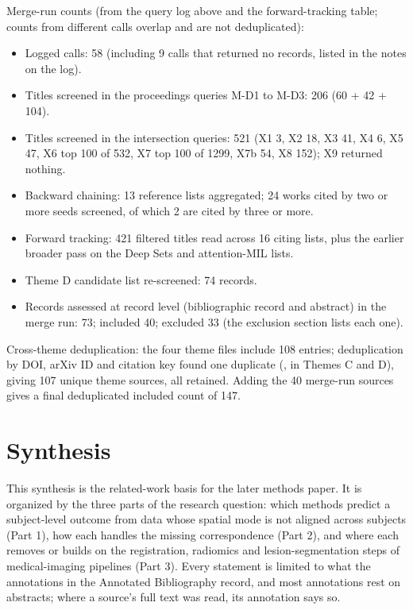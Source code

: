 \documentclass[journal,onecolumn]{IEEEtran}
\begin{document}
Merge-run counts (from the query log above and the forward-tracking table; counts from different calls overlap and are not deduplicated):

\begin{itemize}

\item{} Logged calls: 58 (including 9 calls that returned no records, listed in the notes on the log).

\item{} Titles screened in the proceedings queries M-D1 to M-D3: 206 (60 + 42 + 104).

\item{} Titles screened in the intersection queries: 521 (X1 3, X2 18, X3 41, X4 6, X5 47, X6 top 100 of 532, X7 top 100 of 1299, X7b 54, X8 152); X9 returned nothing.

\item{} Backward chaining: 13 reference lists aggregated; 24 works cited by two or more seeds screened, of which 2 are cited by three or more.

\item{} Forward tracking: 421 filtered titles read across 16 citing lists, plus the earlier broader pass on the Deep Sets and attention-MIL lists.

\item{} Theme D candidate list re-screened: 74 records.

\item{} Records assessed at record level (bibliographic record and abstract) in the merge run: 73; included 40; excluded 33 (the exclusion section lists each one).

\end{itemize}

Cross-theme deduplication: the four theme files include 108 entries; deduplication by DOI, arXiv ID and citation key found one duplicate (\cite{Chen2021AMINN}, in Themes C and D), giving 107 unique theme sources, all retained. Adding the 40 merge-run sources gives a final deduplicated included count of 147.

\section{Synthesis}

This synthesis is the related-work basis for the later methods paper. It is organized by the three parts of the research question: which methods predict a subject-level outcome from data whose spatial mode is not aligned across subjects (Part 1), how each handles the missing correspondence (Part 2), and where each removes or builds on the registration, radiomics and lesion-segmentation steps of medical-imaging pipelines (Part 3). Every statement is limited to what the annotations in the Annotated Bibliography record, and most annotations rest on abstracts; where a source's full text was read, its annotation says so.
\end{document}
